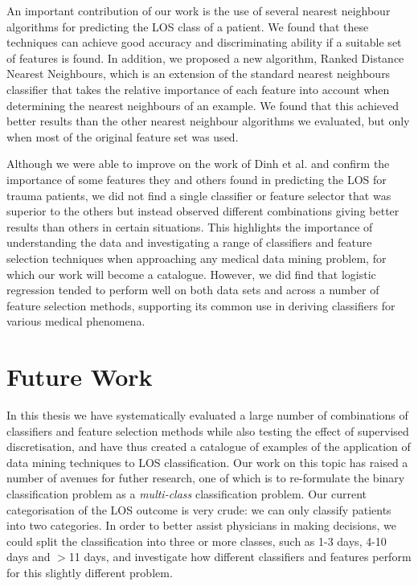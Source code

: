 An important contribution of our work is the use of several nearest neighbour
algorithms for predicting the LOS class of a patient. We found that these
techniques can achieve good accuracy and discriminating ability if a suitable
set of features is found. In addition, we proposed a new algorithm, Ranked
Distance Nearest Neighbours, which is an extension of the standard nearest
neighbours classifier that takes the relative importance
of each feature into account when determining the nearest neighbours of an
example. We found that this achieved better results than the other nearest
neighbour algorithms we evaluated, but only when most of the original feature
set was used.

Although we were able to improve on the work of Dinh et al. \cite{Dinh2013a}
and confirm the
importance of some features they and others found in predicting the LOS for
trauma patients, we did not find a single classifier or feature selector
that was superior to the others but instead observed different combinations
giving better results than others in certain situations. This highlights the
importance of understanding the data and investigating a range of classifiers
and feature selection techniques when approaching any medical data mining
problem, for which our work will become a catalogue.
However, we did find that logistic regression tended to perform well
on both data sets and across a number of feature selection methods, supporting
its common use in deriving classifiers for various medical phenomena.

\section{Future Work}
In this thesis we have systematically evaluated a large number of combinations
of classifiers and feature selection methods while also testing the effect of
supervised discretisation, and have thus created a catalogue of examples of
the application of data mining techniques to LOS classification. Our work on
this topic has raised a number of avenues for futher research, one of which is
to re-formulate the binary classification problem as a \textit{multi-class}
classification problem. Our current categorisation of the LOS outcome is very
crude: we can only classify patients into two categories. In order to better
assist physicians in making decisions, we could split the classification into
three or more classes, such as 1-3 days, 4-10 days and $>$11 days, and
investigate how different classifiers and features perform for this slightly
different problem.

